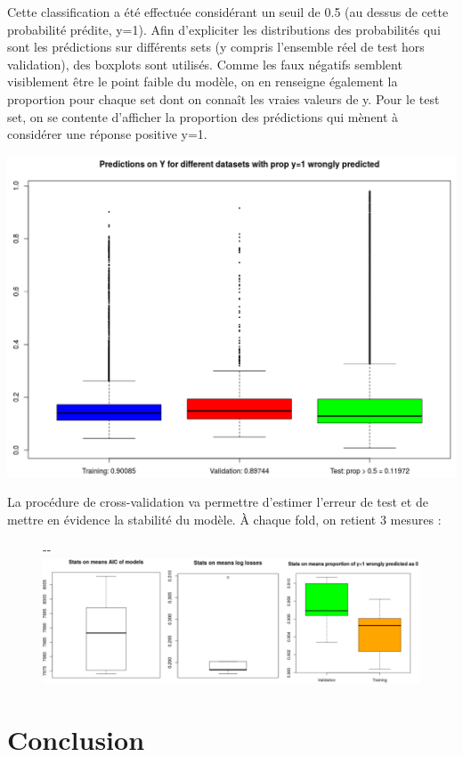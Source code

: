 \documentclass[]{article}
\begin{document}
Cette classification a été effectuée considérant un seuil de 0.5 (au dessus de cette probabilité prédite, y=1). Afin d'expliciter les distributions des probabilités qui sont les prédictions sur différents sets (y compris l'ensemble réel de test hors validation), des boxplots sont utilisés. Comme les faux négatifs semblent visiblement être le point faible du modèle, on en renseigne également la proportion pour chaque set dont on connaît les vraies valeurs de y. Pour le test set, on se contente d'afficher la proportion des prédictions qui mènent à considérer une réponse positive y=1.
\begin{center}
\includegraphics[scale=0.35]{pred_distrib}
\end{center}


La procédure de cross-validation va permettre d'estimer l'erreur de test et de mettre en évidence la stabilité du modèle. À chaque fold, on retient 3 mesures : 

\begin{figure}[!ht]
   \begin{adjustwidth}{-\oddsidemargin-1in}{-\rightmargin}
     \centering
     \includegraphics[width=\textwidth + 1cm]{cv}
   \end{adjustwidth}
\end{figure}

\section{Conclusion}
\end{document}
